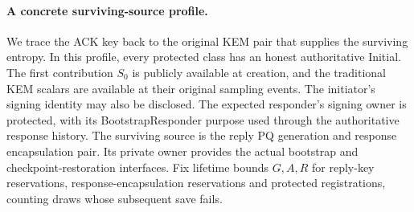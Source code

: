 \documentclass[pdflatex]{sn-jnl}
\theoremstyle{thmstyleone}
\theoremstyle{thmstylethree}
\theoremstyle{thmstyletwo}
\begin{document}
\paragraph{A concrete surviving-source profile.}
We trace the ACK key back to the original KEM pair that supplies the
surviving entropy. In this profile, every protected class has an
honest authoritative Initial. The first contribution $S_0$ is publicly available
at creation, and the traditional KEM scalars are available at their
original sampling events. The initiator's signing identity may also be
disclosed. The expected responder's signing owner is protected, with its
BootstrapResponder purpose used through the authoritative response
history. The surviving source is the reply PQ generation and response
encapsulation pair. Its private owner provides the actual bootstrap and
checkpoint-restoration interfaces. Fix lifetime bounds $G,A,R$ for
reply-key reservations, response-encapsulation reservations and protected
registrations, counting draws whose subsequent save fails.
\end{document}
